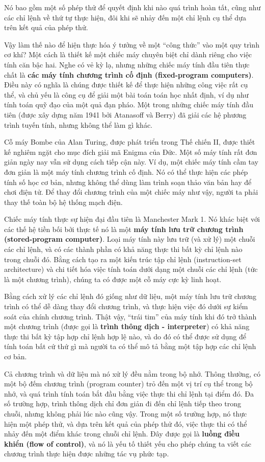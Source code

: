Nó bao gồm một số phép thử để quyết định khi nào quá trình hoàn tất, cũng như các chỉ lệnh về thứ tự thực hiện, đôi khi sẽ nhảy đến một chỉ lệnh cụ thể dựa trên kết quả của phép thử.

Vậy làm thế nào để hiện thực hóa ý tưởng về một ``công thức'' vào một quy trình cơ khí? Một cách là thiết kế một chiếc máy chuyên biệt chỉ dành riêng cho việc tính căn bậc hai. Nghe có vẻ kỳ lạ, nhưng những chiếc máy tính đầu tiên thực chất là \textbf{các máy tính chương trình cố định (fixed-program computers)}. Điều này có nghĩa là chúng được thiết kế để thực hiện những công việc rất cụ thể, và chủ yếu là công cụ để giải một bài toán toán học nhất định, ví dụ như tính toán quỹ đạo của một quả đạn pháo. Một trong những chiếc máy tính đầu tiên (được xây dựng năm 1941 bởi Atanasoff và Berry) đã giải các hệ phương trình tuyến tính, nhưng không thể làm gì khác.

Cỗ máy Bombe của Alan Turing, được phát triển trong Thế chiến II, được thiết kế nghiêm ngặt cho mục đích giải mã Enigma của Đức. Một số máy tính rất đơn giản ngày nay vẫn sử dụng cách tiếp cận này. Ví dụ, một chiếc máy tính cầm tay đơn giản là một máy tính chương trình cố định. Nó có thể thực hiện các phép tính số học cơ bản, nhưng không thể dùng làm trình soạn thảo văn bản hay để chơi điện tử. Để thay đổi chương trình của một chiếc máy như vậy, người ta phải thay thế toàn bộ hệ thống mạch điện.

Chiếc máy tính thực sự hiện đại đầu tiên là Manchester Mark 1. Nó khác biệt với các thế hệ tiền bối bởi thực tế nó là một \textbf{máy tính lưu trữ chương trình (stored-program computer)}. Loại máy tính này lưu trữ (và xử lý) một chuỗi các chỉ lệnh, và có các thành phần có khả năng thực thi bất kỳ chỉ lệnh nào trong chuỗi đó. Bằng cách tạo ra một kiến trúc tập chỉ lệnh (instruction-set architecture) và chi tiết hóa việc tính toán dưới dạng một chuỗi các chỉ lệnh (tức là một chương trình), chúng ta có được một cỗ máy cực kỳ linh hoạt.

Bằng cách xử lý các chỉ lệnh đó giống như dữ liệu, một máy tính lưu trữ chương trình có thể dễ dàng thay đổi chương trình, và thực hiện việc đó dưới sự kiểm soát của chính chương trình. Thật vậy, ``trái tim'' của máy tính khi đó trở thành một chương trình (được gọi là \textbf{trình thông dịch - interpreter}) có khả năng thực thi bất kỳ tập hợp chỉ lệnh hợp lệ nào, và do đó có thể được sử dụng để tính toán bất cứ thứ gì mà người ta có thể mô tả bằng một tập hợp các chỉ lệnh cơ bản.

Cả chương trình và dữ liệu mà nó xử lý đều nằm trong bộ nhớ. Thông thường, có một bộ đếm chương trình (program counter) trỏ đến một vị trí cụ thể trong bộ nhớ, và quá trình tính toán bắt đầu bằng việc thực thi chỉ lệnh tại điểm đó. Đa số trường hợp, trình thông dịch chỉ đơn giản đi đến chỉ lệnh tiếp theo trong chuỗi, nhưng không phải lúc nào cũng vậy. Trong một số trường hợp, nó thực hiện một phép thử, và dựa trên kết quả của phép thử đó, việc thực thi có thể nhảy đến một điểm khác trong chuỗi chỉ lệnh. Đây được gọi là \textbf{luồng điều khiển (flow of control)}, và nó là yếu tố thiết yếu cho phép chúng ta viết các chương trình thực hiện được những tác vụ phức tạp.

